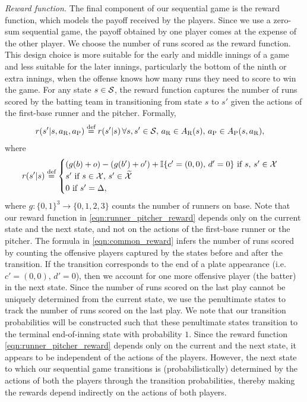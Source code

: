 \documentclass[aoas]{imsart}
\newcommand{\defeq}{\stackrel{\text{def}}{=}}
\begin{document}
    \textit{Reward function.} The final component of our sequential game is the reward function, which models the payoff received by the players. Since we use a  zero-sum sequential game, the payoff obtained by one player comes at the expense of the other player. We choose the number of runs scored as the reward function. This design choice is more suitable for the early and middle innings of a game and less suitable for the later innings, particularly the bottom of the ninth or extra innings, when the offense knows how many runs they need to score to win the game. For any state $s \in {\cal S}$, the reward function captures the number of runs scored by the batting team in transitioning from state $s$ to $s'$ given the actions of the first-base runner and the pitcher. Formally,
    \begin{align}
      \label{eqn:runner_pitcher_reward}
        r(s'|s,a_\text{R},a_\text{P}) &\defeq r(s'|s) 
        \, \forall s,s' \in {\cal S},\, a_\text{R} \in A_\text{R}(s),\,  a_\text{P} \in A_\text{P}(s,a_\text{R}),
    \end{align}
    where
    \begin{align}
      \label{eqn:common_reward}
      r(s'|s) \defeq  \begin{cases}
          (g(b) + o) - (g(b') + o') +\mathbb{I}\{c' = (0, 0),\, d' = 0\} \text{ if } s,\, s' \in \mathcal{X}\\
          s'  \text{ if } s \in \mathcal{X},\, s' \in \widetilde{\cal X}\\
          0  \text{ if } s' = \Delta,
      \end{cases} 
    \end{align}
    where $g: \{0, 1\}^3 \rightarrow \{0, 1, 2, 3\}$ counts the number of runners on base. Note that our reward function in \eqref{eqn:runner_pitcher_reward} depends only on the current state and the next state, and not on the actions of the first-base runner or the pitcher. The formula in \eqref{eqn:common_reward} infers the number of runs scored by counting the offensive players captured by the states before and after the transition. If the transition corresponds to the end of a plate appearance (i.e. $c' = (0, 0),\, d' = 0$), then we account for one more offensive player (the batter) in the next state. Since the number of runs scored on the last play cannot be uniquely determined from the current state, we use the penultimate states to track the number of runs scored on the last play. We note that our transition probabilities will be constructed such that these penultimate states transition to the terminal end-of-inning state with probability $1$. Since the reward function \eqref{eqn:runner_pitcher_reward} depends only on the current and the next state, it appears to be independent of the actions of the players. However, the next state to which our sequential game transitions is (probabilistically) determined by the actions of both the players through the transition probabilities, thereby making the rewards depend indirectly on the actions of both players.
\end{document}
